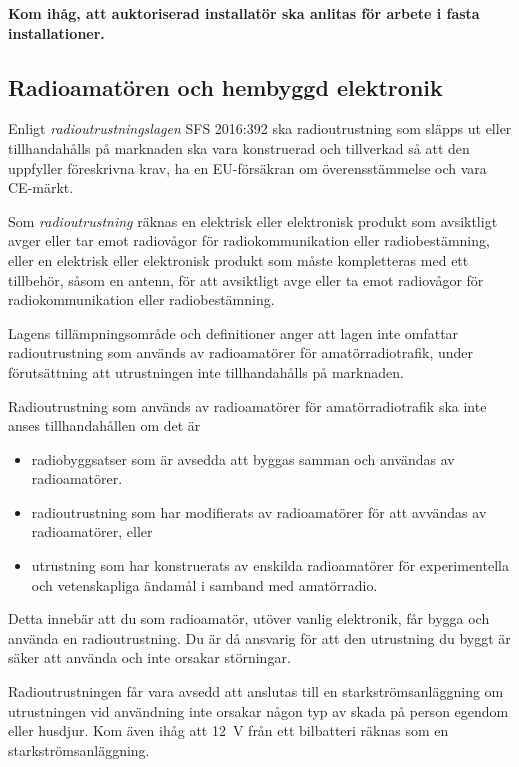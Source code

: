 \textbf{Kom ihåg, att auktoriserad installatör ska anlitas för arbete
i fasta installationer.}

\subsection{Radioamatören och hembyggd elektronik}

Enligt \emph{radioutrustningslagen} SFS 2016:392 \cite{SFS2016:392} ska radioutrustning som
släpps ut eller tillhandahålls på marknaden ska vara konstruerad och
tillverkad så att den uppfyller föreskrivna krav, ha en EU-försäkran om
överensstämmelse och vara CE-märkt.

Som \emph{radioutrustning} räknas en elektrisk eller elektronisk produkt som
avsiktligt avger eller tar emot radiovågor för radiokommunikation eller
radiobestämning, eller en elektrisk eller elektronisk produkt som måste
kompletteras med ett tillbehör, såsom en antenn, för att avsiktligt avge
eller ta emot radiovågor för radiokommunikation eller radiobestämning. 

Lagens tillämpningsområde och definitioner anger att lagen inte omfattar
radioutrustning som används av radioamatörer för amatörradiotrafik, under
förutsättning att utrustningen inte tillhandahålls på marknaden.

Radioutrustning som används av radioamatörer för amatörradiotrafik ska inte
anses tillhandahållen om det är
\begin{itemize}
	\item radiobyggsatser som är avsedda att byggas samman och användas av
	radioamatörer.
	\item radioutrustning som har modifierats av radioamatörer för att
	avvändas av	radioamatörer, eller
	\item utrustning som har konstruerats av enskilda radioamatörer för
	experimentella och vetenskapliga ändamål i samband med amatörradio.
\end{itemize}

Detta innebär att du som radioamatör, utöver vanlig elektronik, får bygga
och använda en radioutrustning. Du är då ansvarig för att den utrustning du
byggt är säker att använda och inte orsakar störningar. 

Radioutrustningen får vara avsedd att anslutas till en starkströmsanläggning
om utrustningen vid användning inte orsakar någon typ av skada på person
egendom eller husdjur. Kom även ihåg att 12~V från ett bilbatteri räknas
som en starkströmsanläggning.

